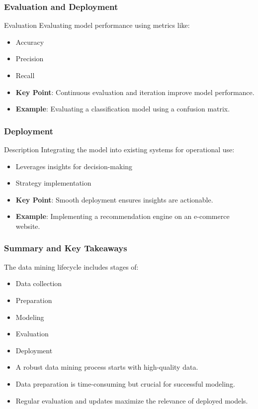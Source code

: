 \documentclass[aspectratio=169]{beamer}
\begin{document}
\begin{frame}[fragile]
    \frametitle{Evaluation and Deployment}
    \begin{block}{Evaluation}
        Evaluating model performance using metrics like:
        \begin{itemize}
            \item Accuracy
            \item Precision
            \item Recall
        \end{itemize}
    \end{block}
    \begin{itemize}
        \item \textbf{Key Point}: Continuous evaluation and iteration improve model performance.
        \item \textbf{Example}: Evaluating a classification model using a confusion matrix.
    \end{itemize}
\end{frame}

\begin{frame}[fragile]
    \frametitle{Deployment}
    \begin{block}{Description}
        Integrating the model into existing systems for operational use:
        \begin{itemize}
            \item Leverages insights for decision-making
            \item Strategy implementation
        \end{itemize}
    \end{block}
    \begin{itemize}
        \item \textbf{Key Point}: Smooth deployment ensures insights are actionable.
        \item \textbf{Example}: Implementing a recommendation engine on an e-commerce website.
    \end{itemize}
\end{frame}

\begin{frame}[fragile]
    \frametitle{Summary and Key Takeaways}
    The data mining lifecycle includes stages of:
    \begin{itemize}
        \item Data collection
        \item Preparation
        \item Modeling
        \item Evaluation 
        \item Deployment
    \end{itemize}
    \begin{itemize}
        \item A robust data mining process starts with high-quality data.
        \item Data preparation is time-consuming but crucial for successful modeling.
        \item Regular evaluation and updates maximize the relevance of deployed models.
    \end{itemize}
\end{frame}
\end{document}
